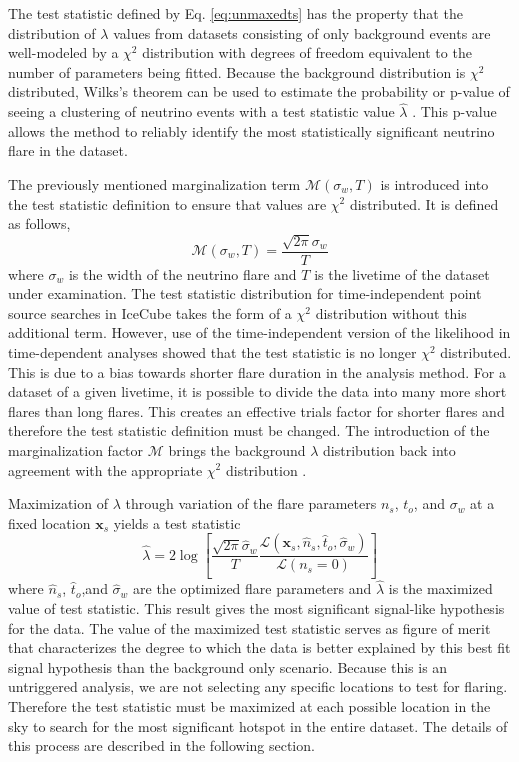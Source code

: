 \documentclass{gatech-thesis}
\begin{document}
The test statistic defined by Eq. \ref{eq:unmaxedts} has the property that the distribution of $\lambda$ values from datasets consisting of only background events are well-modeled by a $\chi^2$ distribution with degrees of freedom equivalent to the number of parameters being fitted. Because the background distribution is $\chi^2$ distributed, Wilks's theorem can be used to estimate the probability or p-value of seeing a clustering of neutrino events with a test statistic value $\hat{\lambda}$ \cite{wilks1938}. This p-value allows the method to reliably identify the most statistically significant neutrino flare in the dataset. 

The previously mentioned marginalization term $\mathcal{M}(\sigma_w,T)$ is introduced into the test statistic definition to ensure that values are $\chi^2$ distributed. It is defined as follows, 
\begin{equation}
\mathcal{M}(\sigma_w,T) = \frac{\sqrt{2\pi}\sigma_w}{T}
\end{equation}
where $\sigma_w$ is the width of the neutrino flare and $T$ is the livetime of the dataset under examination. The test statistic distribution for time-independent point source searches in IceCube takes the form of a $\chi^2$ distribution without this additional term. However, use of the time-independent version of the likelihood in time-dependent analyses showed that the test statistic is no longer $\chi^2$ distributed. This is due to a bias towards shorter flare duration in the analysis method. For a dataset of a given livetime, it is possible to divide the data into many more short flares than long flares. This creates an effective trials factor for shorter flares and therefore the test statistic definition must be changed. The introduction of the marginalization factor $\mathcal{M}$ brings the background $\lambda$ distribution back into agreement with the appropriate $\chi^2$ distribution \cite{2012ApJ...744....1A}.

Maximization of $\lambda$ through variation of the flare parameters $n_s$, $t_o$, and $\sigma_w$ at a fixed location $\mathbf{x}_s$ yields a test statistic
\begin{equation}
\hat{\lambda} = 2\log \left[\frac{\sqrt{2\pi}\hat{\sigma}_w}{T}\frac{\mathcal{L}(\mathbf{x}_s,\hat{n}_s,\hat{t}_o,\hat{\sigma}_w)}{\mathcal{L}(n_s = 0)} \right]
\end{equation}
where $\hat{n}_s$, $\hat{t}_o$,and $\hat{\sigma}_w$ are the optimized flare parameters and $\hat{\lambda}$ is the maximized value of test statistic. This result gives the most significant signal-like hypothesis for the data. The value of the maximized test statistic serves as figure of merit that characterizes the degree to which the data is better explained by this best fit signal hypothesis than the background only scenario. Because this is an untriggered analysis, we are not selecting any specific locations to test for flaring. Therefore the test statistic must be maximized at each possible location in the sky to search for the most significant hotspot in the entire dataset. The details of this process are described in the following section.
\end{document}
